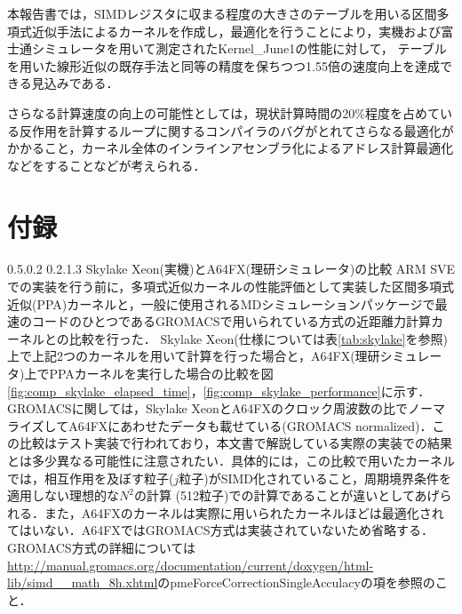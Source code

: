 \documentclass[uplatex,11pt,a4j,titlepage,oneside,openright,dvipdfmx]{jsbook}
\makeatletter
\renewcommand{\section}{%
   \@startsection{section}{1}{\z@}%
   {0.5\Cvs \@plus.0\Cdp \@minus.2\Cdp}%
   {0.2\Cvs \@plus.1\Cdp \@minus.3\Cdp}%
   {\reset@font\large\bfseries}}%
\makeatother
\begin{document}
本報告書では，SIMDレジスタに収まる程度の大きさのテーブルを用いる区間多項式近似手法によるカーネルを作成し，最適化を行うことにより，実機および富士通シミュレータを用いて測定されたKernel\_June1の性能に対して，
テーブルを用いた線形近似の既存手法と同等の精度を保ちつつ1.55倍の速度向上を達成できる見込みである．

さらなる計算速度の向上の可能性としては，現状計算時間の20\%程度を占めている反作用を計算するループに関するコンパイラのバグがとれてさらなる最適化がかかること，カーネル全体のインラインアセンブラ化によるアドレス計算最適化などをすることなどが考えられる．




\chapter*{付録}

\section{Skylake Xeon(実機)とA64FX(理研シミュレータ)の比較}
ARM SVEでの実装を行う前に，多項式近似カーネルの性能評価として実装した区間多項式近似(PPA)カーネルと，一般に使用されるMDシミュレーションパッケージで最速のコードのひとつであるGROMACSで用いられている方式の近距離力計算カーネルとの比較を行った．
Skylake Xeon(仕様については表\ref{tab:skylake}を参照)上で上記2つのカーネルを用いて計算を行った場合と，A64FX(理研シミュレータ)上でPPAカーネルを実行した場合の比較を図\ref{fig:comp_skylake_elapsed_time}，\ref{fig:comp_skylake_performance}に示す．GROMACSに関しては，Skylake XeonとA64FXのクロック周波数の比でノーマライズしてA64FXにあわせたデータも載せている(GROMACS normalized)．この比較はテスト実装で行われており，本文書で解説している実際の実装での結果とは多少異なる可能性に注意されたい．具体的には，この比較で用いたカーネルでは，相互作用を及ぼす粒子($j$粒子)がSIMD化されていること，周期境界条件を適用しない理想的な$N^2$の計算 (512粒子)での計算であることが違いとしてあげられる．また，A64FXのカーネルは実際に用いられたカーネルほどは最適化されてはいない．A64FXではGROMACS方式は実装されていないため省略する．
GROMACS方式の詳細については\url{http://manual.gromacs.org/documentation/current/doxygen/html-lib/simd__math_8h.xhtml}のpmeForceCorrectionSingleAcculacyの項を参照のこと．
\end{document}
